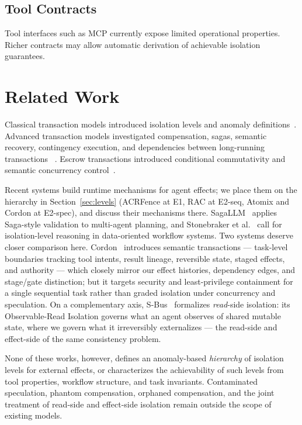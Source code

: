 \documentclass[11pt]{article}
\begin{document}
\subsection{Tool Contracts}

Tool interfaces such as MCP currently expose limited operational
properties. Richer contracts may allow automatic derivation of
achievable isolation guarantees.

\section{Related Work}

Classical transaction models introduced isolation levels and anomaly
definitions~\cite{berenson1995critique,adya1999}. Advanced transaction
models investigated compensation, sagas, semantic recovery, contingency
execution, and dependencies between long-running transactions
~\cite{garcia1987sagas,korth1990formal,chrysanthis1991acta}. Escrow
transactions introduced conditional commutativity and semantic
concurrency control~\cite{oneil1986escrow}.

Recent systems build runtime mechanisms for agent effects; we place them
on the hierarchy in Section~\ref{sec:levels} (ACRFence at E1, RAC at
E2-seq, Atomix and Cordon at E2-spec), and discuss their mechanisms there.
SagaLLM~\cite{chang2025sagallm} applies Saga-style validation to
multi-agent planning, and Stonebraker et
al.~\cite{stonebraker2025consistency} call for isolation-level reasoning in
data-oriented workflow systems. Two systems deserve closer comparison
here. Cordon~\cite{chen2026cordon} introduces semantic transactions ---
task-level boundaries tracking tool intents, result lineage, reversible
state, staged effects, and authority --- which closely mirror our effect
histories, dependency edges, and stage/gate distinction; but it targets
security and least-privilege containment for a single sequential task
rather than graded isolation under concurrency and speculation. On a
complementary axis, S-Bus~\cite{khan2026sbus} formalizes \emph{read}-side
isolation: its Observable-Read Isolation governs what an agent observes of
shared mutable state, where we govern what it irreversibly externalizes ---
the read-side and effect-side of the same consistency problem.

None of these works, however, defines an anomaly-based \emph{hierarchy} of
isolation levels for external effects, or characterizes the achievability
of such levels from tool properties, workflow structure, and task
invariants. Contaminated speculation, phantom compensation, orphaned
compensation, and the joint treatment of read-side and effect-side
isolation remain outside the scope of existing models.



\end{document}
